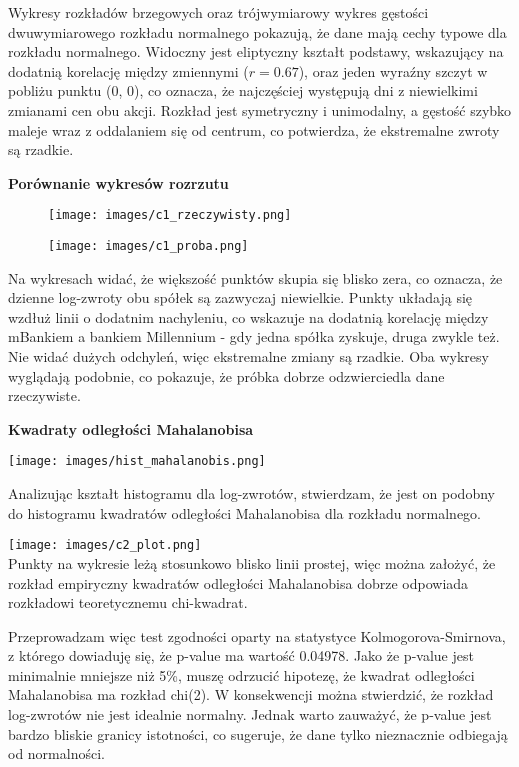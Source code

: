 \documentclass[12pt]{article}
\begin{document}
Wykresy rozkładów brzegowych oraz trójwymiarowy wykres gęstości dwuwymiarowego rozkładu normalnego pokazują, że dane mają cechy typowe dla rozkładu normalnego. Widoczny jest eliptyczny kształt podstawy, wskazujący na dodatnią korelację między zmiennymi ($r = 0.67$), oraz jeden wyraźny szczyt w pobliżu punktu (0, 0), co oznacza, że najczęściej występują dni z niewielkimi zmianami cen obu akcji. Rozkład jest symetryczny i unimodalny, a gęstość szybko maleje wraz z oddalaniem się od centrum, co potwierdza, że ekstremalne zwroty są rzadkie.

\clearpage
{\bf \large Porównanie wykresów rozrzutu}

\begin{figure}[h!]
\centering
\begin{minipage}{.5\textwidth}
  \centering
  \texttt{[image: images/c1\_rzeczywisty.png]}
  \label{fig:test1}
\end{minipage}%
\begin{minipage}{.5\textwidth}
  \centering
  \texttt{[image: images/c1\_proba.png]}
  \label{fig:test2}
\end{minipage}
\end{figure}

Na wykresach widać, że większość punktów skupia się blisko zera, co oznacza, że dzienne log-zwroty obu spółek są zazwyczaj niewielkie. Punkty układają się wzdłuż linii o dodatnim nachyleniu, co wskazuje na dodatnią korelację między mBankiem a bankiem Millennium - gdy jedna spółka zyskuje, druga zwykle też. Nie widać dużych odchyleń, więc ekstremalne zmiany są rzadkie. Oba wykresy wyglądają podobnie, co pokazuje, że próbka dobrze odzwierciedla dane rzeczywiste.

\vspace{0.3 cm}
{\bf \large Kwadraty odległości Mahalanobisa}

\texttt{[image: images/hist\_mahalanobis.png]}
\vspace{0 cm}

Analizując kształt histogramu dla log-zwrotów, stwierdzam, że jest on podobny do histogramu kwadratów odległości Mahalanobisa dla rozkładu normalnego.

\texttt{[image: images/c2\_plot.png]}
\vspace{1 cm}
\\
Punkty na wykresie leżą stosunkowo blisko linii prostej, więc można założyć, że rozkład empiryczny kwadratów odległości Mahalanobisa dobrze odpowiada rozkładowi teoretycznemu chi-kwadrat. 
\par
Przeprowadzam więc test zgodności oparty na statystyce Kolmogorova-Smirnova, z którego dowiaduję się, że p-value ma wartość 0.04978. Jako że p-value jest minimalnie mniejsze niż 5\%, muszę odrzucić hipotezę, że kwadrat odległości Mahalanobisa ma rozkład chi(2). W konsekwencji można stwierdzić, że rozkład log-zwrotów nie jest idealnie normalny. Jednak warto zauważyć, że p-value jest bardzo bliskie granicy istotności, co sugeruje, że dane tylko nieznacznie odbiegają od normalności.
\end{document}
